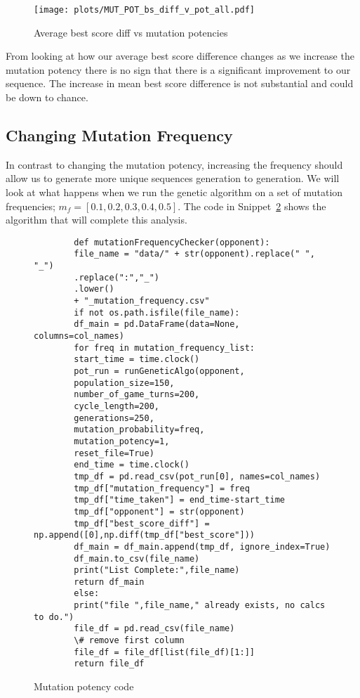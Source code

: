 \begin{figure}[h]
    \texttt{[image: plots/MUT\_POT\_bs\_diff\_v\_pot\_all.pdf]}
    \caption{Average best score diff vs mutation potencies}\label{fig:MUT-POT-bs-diff-v-pot-all}
\end{figure}

From looking at how our average best score difference changes as we increase the mutation potency there is no sign that there is a significant improvement to our sequence.
The increase in mean best score difference is not substantial and could be down to chance.

\subsection{Changing Mutation Frequency}\label{subsec:changingMutationFrequency}
In contrast to changing the mutation potency, increasing the frequency should allow us to generate more unique sequences generation to generation.
We will look at what happens when we run the genetic algorithm on a set of mutation frequencies; \(m_f = [0.1,0.2,0.3,0.4,0.5]\).
The code in Snippet~\ref{code:mutationFrequencyChecker} shows the algorithm that will complete this analysis.\\

\begin{figure}
    \begin{verbatim}
        def mutationFrequencyChecker(opponent):
        file_name = "data/" + str(opponent).replace(" ", "_")
        .replace(":","_")
        .lower()
        + "_mutation_frequency.csv"
        if not os.path.isfile(file_name):
        df_main = pd.DataFrame(data=None, columns=col_names)
        for freq in mutation_frequency_list:
        start_time = time.clock()
        pot_run = runGeneticAlgo(opponent,
        population_size=150,
        number_of_game_turns=200,
        cycle_length=200,
        generations=250,
        mutation_probability=freq,
        mutation_potency=1,
        reset_file=True)
        end_time = time.clock()
        tmp_df = pd.read_csv(pot_run[0], names=col_names)
        tmp_df["mutation_frequency"] = freq
        tmp_df["time_taken"] = end_time-start_time
        tmp_df["opponent"] = str(opponent)
        tmp_df["best_score_diff"] = np.append([0],np.diff(tmp_df["best_score"]))
        df_main = df_main.append(tmp_df, ignore_index=True)
        df_main.to_csv(file_name)
        print("List Complete:",file_name)
        return df_main
        else:
        print("file ",file_name," already exists, no calcs to do.")
        file_df = pd.read_csv(file_name)
        \# remove first column
        file_df = file_df[list(file_df)[1:]]
        return file_df
    \end{verbatim}
    \caption{Mutation potency code}\label{code:mutationFrequencyChecker}
\end{figure}


